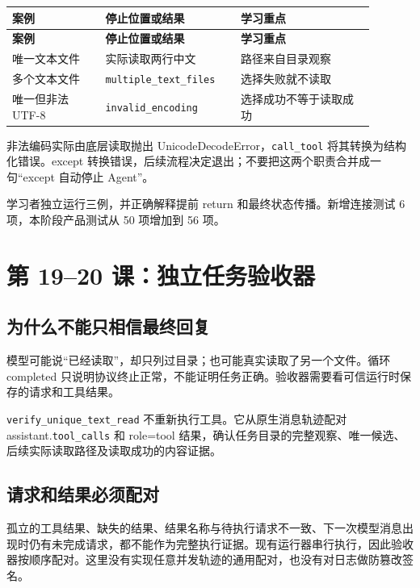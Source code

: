 \documentclass[UTF8,zihao=-4,fontset=fandol]{ctexart}
\begin{document}
{\small\setlength{\tabcolsep}{4pt}
\renewcommand{\arraystretch}{1.25}
\begin{longtable}{>{\raggedright\arraybackslash}p{0.23\linewidth}>{\raggedright\arraybackslash}p{0.33\linewidth}>{\raggedright\arraybackslash}p{0.33\linewidth}}
\toprule
\textbf{案例} & \textbf{停止位置或结果} & \textbf{学习重点} \\
\midrule\endfirsthead
\toprule
\textbf{案例} & \textbf{停止位置或结果} & \textbf{学习重点} \\
\midrule\endhead
\bottomrule\endfoot
唯一文本文件 & 实际读取两行中文 & 路径来自目录观察 \\
多个文本文件 & \nolinkurl{multiple_text_files} & 选择失败就不读取 \\
唯一但非法 UTF-8 & \nolinkurl{invalid_encoding} & 选择成功不等于读取成功 \\
\end{longtable}}

非法编码实际由底层读取抛出 UnicodeDecodeError，\nolinkurl{call_tool} 将其转换为结构化错误。except 转换错误，后续流程决定退出；不要把这两个职责合并成一句“except 自动停止 Agent”。

学习者独立运行三例，并正确解释提前 return 和最终状态传播。新增连接测试 6 项，本阶段产品测试从 50 项增加到 56 项。

\section{第 19–20 课：独立任务验收器}

\subsection{为什么不能只相信最终回复}

模型可能说“已经读取”，却只列过目录；也可能真实读取了另一个文件。循环 completed 只说明协议终止正常，不能证明任务正确。验收器需要看可信运行时保存的请求和工具结果。

\nolinkurl{verify_unique_text_read} 不重新执行工具。它从原生消息轨迹配对 assistant.\nolinkurl{tool_calls} 和 role=tool 结果，确认任务目录的完整观察、唯一候选、后续实际读取路径及读取成功的内容证据。

\subsection{请求和结果必须配对}

孤立的工具结果、缺失的结果、结果名称与待执行请求不一致、下一次模型消息出现时仍有未完成请求，都不能作为完整执行证据。现有运行器串行执行，因此验收器按顺序配对。这里没有实现任意并发轨迹的通用配对，也没有对日志做防篡改签名。
\end{document}
